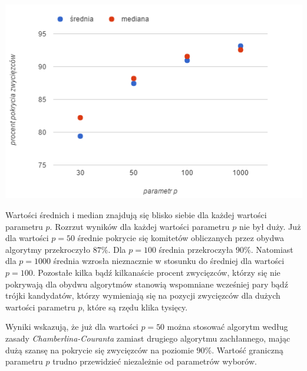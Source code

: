 \documentclass[polish,11pt]{aghthesis}
\begin{document}
\begin{center}
\centerline{\includegraphics[scale=1]{pics/srednia_mediana_od_parametr_p.png}}
\end{center}

\noindent Wartości średnich i median znajdują się blisko siebie dla każdej wartości parametru $p$. Rozrzut wyników dla każdej wartości parametru $p$ nie był duży. Już dla wartości $p = 50$ średnie pokrycie się komitetów obliczanych przez obydwa algorytmy przekroczyło $87\%$. Dla $p = 100$ średnia przekroczyła $90 \%$. Natomiast dla $p = 1000$ średnia wzrosła nieznacznie w stosunku do średniej dla wartości $p = 100$. Pozostałe kilka bądź kilkanaście procent zwycięzców, którzy się nie pokrywają dla obydwu algorytmów stanowią wspomniane wcześniej pary bądź trójki kandydatów, którzy wymieniają się na pozycji zwycięzców dla dużych wartości parametru $p$, które są rzędu klika tysięcy.

\noindent Wyniki wskazują, że już dla wartości $p = 50$ można stosować algorytm według zasady \mbox{\textit{Chamberlina-Couranta}} zamiast drugiego algorytmu zachłannego, mając dużą szansę na pokrycie się zwycięzców na poziomie $90 \%$. Wartość graniczną parametru $p$ trudno przewidzieć niezależnie od parametrów wyborów.  




\end{document}
